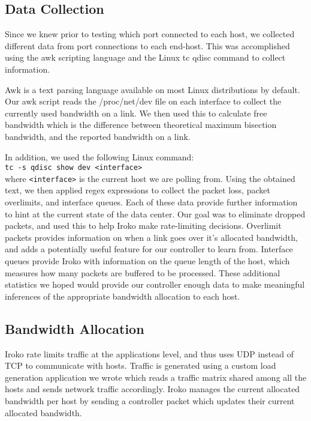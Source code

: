 \subsection{Data Collection }
Since we knew prior to testing which port connected to each host, we collected different data from port connections to each end-host. This was accomplished using the awk scripting language and the Linux tc qdisc command to collect information.

Awk is a text parsing language available on most Linux distributions by default. Our awk script reads the /proc/net/dev file on each interface to collect the currently used  bandwidth on a link. We then used this to calculate free bandwidth which is the difference between theoretical maximum bisection bandwidth, and the reported bandwidth on a link.

In addition, we used the following Linux command:\\
\texttt{tc -s qdisc show dev <interface>}\\
where \texttt{<interface>} is the current host we are polling from. Using the 
obtained text, we then applied regex expressions to collect the packet loss, 
packet overlimits, and interface queues. Each of these data provide further 
information to hint at the current state of the data center. Our goal was to 
eliminate dropped packets, and used this to help Iroko make rate-limiting 
decisions. Overlimit packets provides information on when a link goes over it’s 
allocated bandwidth, and adds a potentially useful feature for our controller 
to learn from. Interface queues provide Iroko with information on the queue 
length of the host, which measures how many packets are buffered to be 
processed.  These additional statistics we hoped would provide our controller 
enough data to make meaningful inferences of the appropriate bandwidth 
allocation to each host. 

\subsection{Bandwidth Allocation}
Iroko rate limits traffic at the applications level, and thus uses UDP instead of TCP to communicate with hosts. Traffic is generated using a custom load generation application we wrote which reads a traffic matrix shared among all the hosts and sends network traffic accordingly. Iroko manages the current allocated bandwidth per host by sending a controller packet which updates their current allocated bandwidth.


